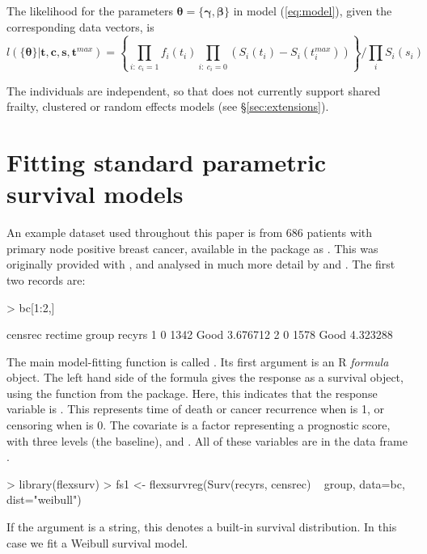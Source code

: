 \documentclass[nojss,nofooter]{jss}
\begin{document}
The likelihood for the parameters $\bm{\theta} = \{\bm{\gamma},\bm{\beta}\}$ in model
(\ref{eq:model}), given the corresponding data vectors, is
\begin{equation}
  \label{eq:lik}
  l(\{\bm{\theta}\} | \mathbf{t},\mathbf{c},\mathbf{s},\mathbf{t}^{max}) = \left\{ \prod_{i:\ c_i=1} f_i(t_i) \prod_{i:\ c_i=0} \left(S_i(t_i) - S_i(t^{max}_i)\right)\right\} / \prod_i S_i(s_i)  
\end{equation}

The individuals are independent, so that  does not
currently support shared frailty, clustered or random effects models
(see \S\ref{sec:extensions}).

\section{Fitting standard parametric survival models} 
\label{sec:models}

An example dataset used throughout this paper is from 686 patients
with primary node positive breast cancer, available in the package as
. This was originally provided with 
\citep{stpm:orig}, and analysed in much more detail by
\citet{sauerbrei1999building} and \citet{royston:parmar}.  The first
two records are:
\begin{Schunk}
\begin{Sinput}
> bc[1:2,]
\end{Sinput}
\begin{Soutput}
  censrec rectime group   recyrs
1       0    1342  Good 3.676712
2       0    1578  Good 4.323288
\end{Soutput}
\end{Schunk}
The main model-fitting function is called .  Its
first argument is an R \emph{formula} object.  The left hand side of
the formula gives the response as a survival object, using the
 function from the  package.  Here, this
indicates that the response variable is . 
This represents time of death or cancer recurrence when  is 1, 
or censoring when  is 0.  The covariate  is
a factor representing a prognostic score, with three levels
 (the baseline),  and
. All of these variables are in the data frame
.
\begin{Schunk}
\begin{Sinput}
> library(flexsurv)
> fs1 <- flexsurvreg(Surv(recyrs, censrec) ~ group, data=bc, dist="weibull")
\end{Sinput}
\end{Schunk}
If the argument  is a string, this denotes a built-in
survival distribution.  In this case we fit a Weibull survival model.
\end{document}
